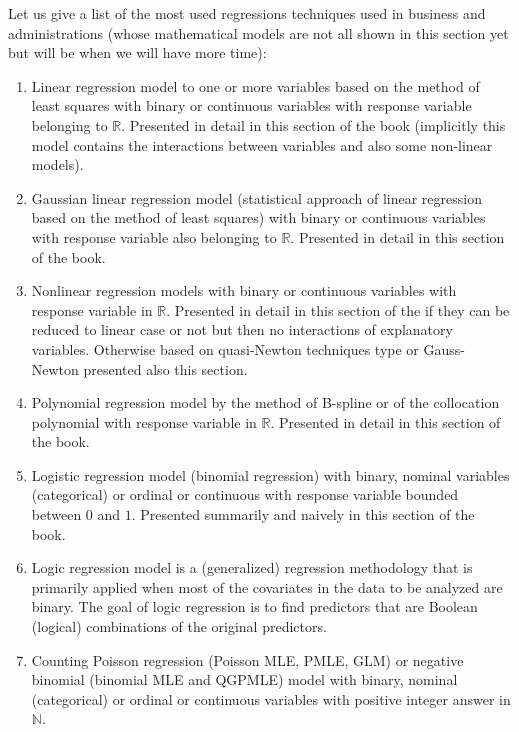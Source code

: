 	Let us give a list of the most used regressions techniques used in business and administrations (whose mathematical models are not all shown in this section yet but will be when we will have more time):
	\begin{enumerate}
		\item Linear regression model to one or more variables based on the method of least squares with binary or continuous variables with response variable belonging to $\mathbb{R}$. Presented in detail in this section of the book (implicitly this model contains the interactions between variables and also some non-linear models).
		
		\item Gaussian linear regression model (statistical approach of linear regression based on the method of least squares) with binary or  continuous variables with response variable also belonging to $\mathbb{R}$. Presented in detail in this section of the book.
		
		\item Nonlinear regression models with binary or continuous variables with response variable in $\mathbb{R}$. Presented in detail in this section of the if they can be reduced to linear case or not but then no interactions of explanatory variables. Otherwise based on quasi-Newton techniques type or Gauss-Newton presented also this section.
		
		\item Polynomial regression model by the method of B-spline or of the collocation polynomial with response variable in $\mathbb{R}$. Presented in detail in this section of the book.
		
		\item Logistic regression model (binomial regression) with binary, nominal variables (categorical) or ordinal or continuous with response variable bounded between $0$ and $1$. Presented summarily and naively in this section of the book.
		
		\item Logic regression model is a (generalized) regression methodology that is primarily applied when most of the covariates in the data to be analyzed are binary. The goal of logic regression is to find predictors that are Boolean (logical) combinations of the original predictors. 
		
		\item Counting Poisson regression (Poisson MLE, PMLE, GLM) or negative binomial (binomial MLE and QGPMLE) model with binary, nominal (categorical) or ordinal or continuous variables with positive integer answer in $\mathbb{N}$.
		

\end{enumerate}

